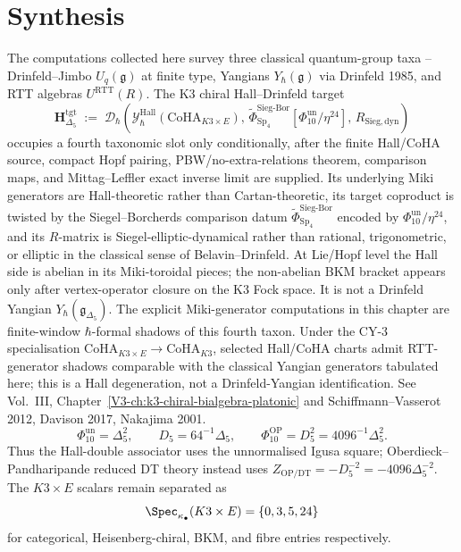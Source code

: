 \section{Synthesis}
\label{sec:yangcomp-supplement}

\begin{remark}
\label{rem:yangcomp-1}
The computations collected here survey three classical quantum-group
taxa -- Drinfeld--Jimbo $U_q(\mathfrak g)$ at finite type, Yangians
$Y_\hbar(\mathfrak g)$ via Drinfeld 1985, and RTT algebras
$U^{\mathrm{RTT}}(R)$. The K3 chiral Hall--Drinfeld target
\[
\mathbf{H}_{\Delta_5}^{\mathrm{tgt}} \;:=\; \mathcal{D}_\hbar\!\left(\mathcal{Y}^{\mathrm{Hall}}_\hbar(\mathrm{CoHA}_{K3\times E}),\,
\widetilde{\Phi}^{\mathrm{Sieg\text{-}Bor}}_{\mathrm{Sp}_4}[\Phi_{10}^{\mathrm{un}}/\eta^{24}],\,
R_{\mathrm{Sieg,dyn}}\right)
\]
occupies a fourth taxonomic slot only conditionally, after the finite
Hall/CoHA source, compact Hopf pairing, PBW/no-extra-relations
theorem, comparison maps, and Mittag--Leffler exact inverse limit are
supplied. Its underlying Miki generators are Hall-theoretic rather
than Cartan-theoretic, its target coproduct is twisted by the
Siegel--Borcherds comparison datum
$\widetilde{\Phi}^{\mathrm{Sieg\text{-}Bor}}_{\mathrm{Sp}_4}$
encoded by $\Phi_{10}^{\mathrm{un}}/\eta^{24}$, and its $R$-matrix is
Siegel-elliptic-dynamical rather than rational, trigonometric, or
elliptic in the classical sense of Belavin--Drinfeld. At Lie/Hopf
level the Hall side is abelian in its Miki-toroidal pieces; the
non-abelian BKM bracket appears only after vertex-operator closure on
the K3 Fock space. It is not a Drinfeld Yangian
\(Y_\hbar(\mathfrak g_{\Delta_5})\). The explicit
Miki-generator computations in this chapter are finite-window
\(\hbar\)-formal shadows of this fourth taxon. Under the CY-3 specialisation
\(\mathrm{CoHA}_{K3\times E}\to\mathrm{CoHA}_{K3}\), selected Hall/CoHA
charts admit RTT-generator shadows comparable with the classical
Yangian generators tabulated here; this is a Hall degeneration, not a
Drinfeld-Yangian identification. See Vol.~III,
Chapter~\ref{V3-ch:k3-chiral-bialgebra-platonic} and Schiffmann--Vasserot 2012,
Davison 2017, Nakajima 2001.
\[
\Phi_{10}^{\mathrm{un}}=\Delta_5^2,\qquad
D_5=64^{-1}\Delta_5,\qquad
\Phi_{10}^{\mathrm{OP}}=D_5^2=4096^{-1}\Delta_5^2.
\]
Thus the Hall-double associator uses the unnormalised Igusa square;
Oberdieck--Pandharipande reduced DT theory instead uses
$Z_{\mathrm{OP/DT}}=-D_5^{-2}=-4096\Delta_5^{-2}$. The
$K3\times E$ scalars remain separated as
\[
\Spec_{\kappa_\bullet}(K3\times E)=\{0,3,5,24\}
\]
for categorical, Heisenberg-chiral, BKM, and fibre entries
respectively.
\end{remark}

